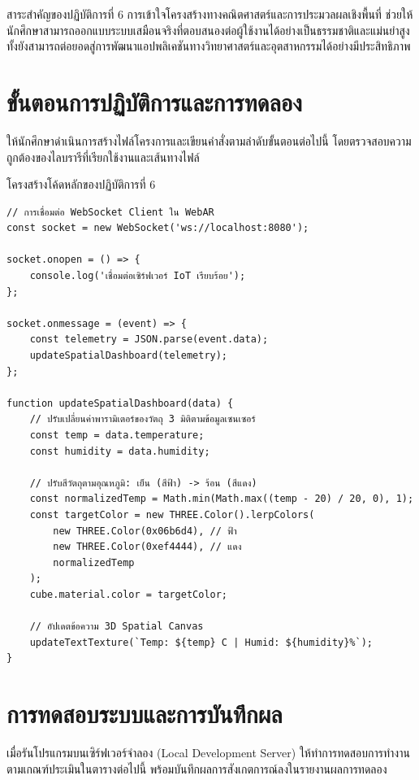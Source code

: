 \begin{conceptbox}{สาระสำคัญของปฏิบัติการที่ 6}
การเข้าใจโครงสร้างทางคณิตศาสตร์และการประมวลผลเชิงพื้นที่ ช่วยให้นักศึกษาสามารถออกแบบระบบเสมือนจริงที่ตอบสนองต่อผู้ใช้งานได้อย่างเป็นธรรมชาติและแม่นยำสูง ทั้งยังสามารถต่อยอดสู่การพัฒนาแอปพลิเคชันทางวิทยาศาสตร์และอุตสาหกรรมได้อย่างมีประสิทธิภาพ
\end{conceptbox}

\section{ขั้นตอนการปฏิบัติการและการทดลอง}

ให้นักศึกษาดำเนินการสร้างไฟล์โครงการและเขียนคำสั่งตามลำดับขั้นตอนต่อไปนี้ โดยตรวจสอบความถูกต้องของไลบรารีที่เรียกใช้งานและเส้นทางไฟล์

\begin{codebox}{โครงสร้างโค้ดหลักของปฏิบัติการที่ 6}
\begin{lstlisting}[language=HTML]
// การเชื่อมต่อ WebSocket Client ใน WebAR
const socket = new WebSocket('ws://localhost:8080');

socket.onopen = () => {
    console.log('เชื่อมต่อเซิร์ฟเวอร์ IoT เรียบร้อย');
};

socket.onmessage = (event) => {
    const telemetry = JSON.parse(event.data);
    updateSpatialDashboard(telemetry);
};

function updateSpatialDashboard(data) {
    // ปรับเปลี่ยนค่าพารามิเตอร์ของวัตถุ 3 มิติตามข้อมูลเซนเซอร์
    const temp = data.temperature;
    const humidity = data.humidity;
    
    // ปรับสีวัตถุตามอุณหภูมิ: เย็น (สีฟ้า) -> ร้อน (สีแดง)
    const normalizedTemp = Math.min(Math.max((temp - 20) / 20, 0), 1);
    const targetColor = new THREE.Color().lerpColors(
        new THREE.Color(0x06b6d4), // ฟ้า
        new THREE.Color(0xef4444), // แดง
        normalizedTemp
    );
    cube.material.color = targetColor;
    
    // อัปเดตข้อความ 3D Spatial Canvas
    updateTextTexture(`Temp: ${temp} C | Humid: ${humidity}%`);
}
\end{lstlisting}
\end{codebox}

\section{การทดสอบระบบและการบันทึกผล}

เมื่อรันโปรแกรมบนเซิร์ฟเวอร์จำลอง (Local Development Server) ให้ทำการทดสอบการทำงานตามเกณฑ์ประเมินในตารางต่อไปนี้ พร้อมบันทึกผลการสังเกตการณ์ลงในรายงานผลการทดลอง

